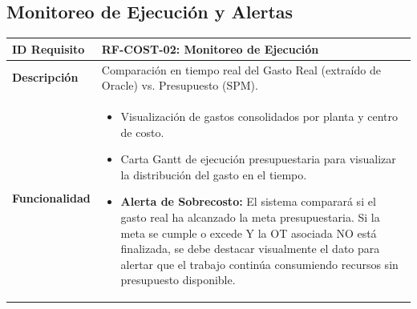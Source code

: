 \documentclass[11pt, letterpaper]{article}
\begin{document}
\subsection{Monitoreo de Ejecución y Alertas}
\begin{longtable}{|p{3.5cm}|p{11.5cm}|}
\hline
\rowcolor{headergray} \textbf{ID Requisito} & \textbf{RF-COST-02: Monitoreo de Ejecución} \\ \hline
\textbf{Descripción} & Comparación en tiempo real del Gasto Real (extraído de Oracle) vs. Presupuesto (SPM). \\ \hline
\textbf{Funcionalidad} & 
\begin{itemize}
    \item Visualización de gastos consolidados por planta y centro de costo.
    \item Carta Gantt de ejecución presupuestaria para visualizar la distribución del gasto en el tiempo.
    \item \textbf{Alerta de Sobrecosto:} El sistema comparará si el gasto real ha alcanzado la meta presupuestaria. Si la meta se cumple o excede Y la OT asociada NO está finalizada, se debe destacar visualmente el dato para alertar que el trabajo continúa consumiendo recursos sin presupuesto disponible.
\end{itemize} \\ \hline
\end{longtable}
\end{document}
